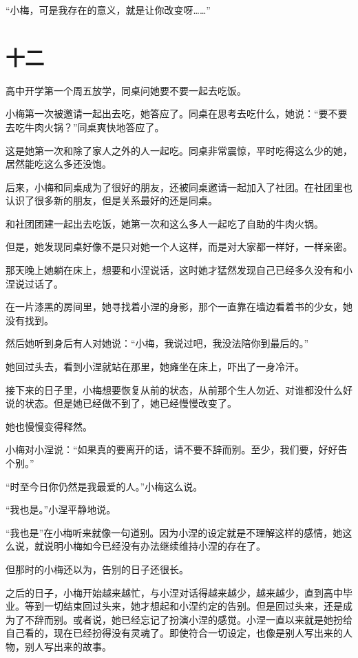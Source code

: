 \documentclass[12pt,a4paper]{ctexart}
\begin{document}
“小梅，可是我存在的意义，就是让你改变呀……”

\section{十二}

高中开学第一个周五放学，同桌问她要不要一起去吃饭。

小梅第一次被邀请一起出去吃，她答应了。同桌在思考去吃什么，她说：“要不要去吃牛肉火锅？”同桌爽快地答应了。

这是她第一次和除了家人之外的人一起吃。同桌非常震惊，平时吃得这么少的她，居然能吃这么多还没饱。

后来，小梅和同桌成为了很好的朋友，还被同桌邀请一起加入了社团。在社团里也认识了很多新的朋友，但是关系最好的还是同桌。

和社团团建一起出去吃饭，她第一次和这么多人一起吃了自助的牛肉火锅。

但是，她发现同桌好像不是只对她一个人这样，而是对大家都一样好，一样亲密。

那天晚上她躺在床上，想要和小涅说话，这时她才猛然发现自己已经多久没有和小涅说过话了。

在一片漆黑的房间里，她寻找着小涅的身影，那个一直靠在墙边看着书的少女，她没有找到。

然后她听到身后有人对她说：“小梅，我说过吧，我没法陪你到最后的。”

她回过头去，看到小涅就站在那里，她瘫坐在床上，吓出了一身冷汗。

接下来的日子里，小梅想要恢复从前的状态，从前那个生人勿近、对谁都没什么好说的状态。但是她已经做不到了，她已经慢慢改变了。

她也慢慢变得释然。

小梅对小涅说：“如果真的要离开的话，请不要不辞而别。至少，我们要，好好告个别。”

“时至今日你仍然是我最爱的人。”小梅这么说。

“我也是。”小涅平静地说。

“我也是”在小梅听来就像一句道别。因为小涅的设定就是不理解这样的感情，她这么说，就说明小梅如今已经没有办法继续维持小涅的存在了。

但那时的小梅还以为，告别的日子还很长。

之后的日子，小梅开始越来越忙，与小涅对话得越来越少，越来越少，直到高中毕业。等到一切结束回过头来，她才想起和小涅约定的告别。但是回过头来，还是成为了不辞而别。或者说，她已经忘记了扮演小涅的感觉。小涅一直以来就是她扮给自己看的，现在已经扮得没有灵魂了。即使符合一切设定，也像是别人写出来的人物，别人写出来的故事。
\end{document}
